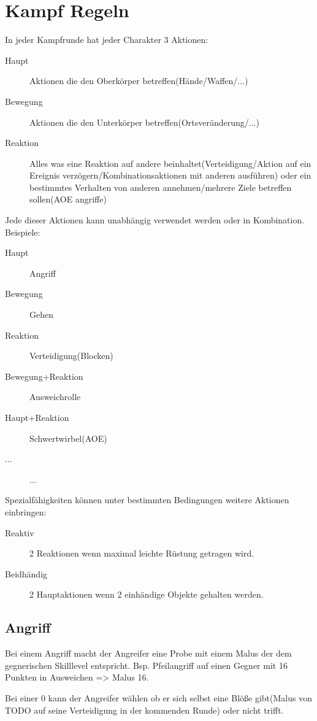\chapter{Kampf Regeln}

In jeder Kampfrunde hat jeder Charakter 3 Aktionen:
\begin{description}
\item[Haupt] Aktionen die den Oberkörper betreffen(Hände/Waffen/...)
\item[Bewegung] Aktionen die den Unterkörper betreffen(Ortsveränderung/...)
\item[Reaktion] Alles was eine Reaktion auf andere beinhaltet(Verteidigung/Aktion auf ein Ereignis verzögern/Kombinationsaktionen mit anderen ausführen) oder ein bestimmtes Verhalten von anderen annehmen/mehrere Ziele betreffen sollen(AOE angriffe)
\end{description}

Jede dieser Aktionen kann unabhängig verwendet werden oder in Kombination. Beispiele:
\begin{description}
\item[Haupt] Angriff
\item[Bewegung] Gehen
\item[Reaktion] Verteidigung(Blocken)
\item[Bewegung+Reaktion] Ausweichrolle
\item[Haupt+Reaktion] Schwertwirbel(AOE)
\item[...] ...
\end{description}

Spezialfähigkeiten können unter bestimmten Bedingungen weitere Aktionen einbringen:
\begin{description}
\item[Reaktiv] 2 Reaktionen wenn maximal leichte Rüstung getragen wird.
\item[Beidhändig] 2 Hauptaktionen wenn 2 einhändige Objekte gehalten werden.
\end{description}

\section{Angriff}
Bei einem Angriff macht der Angreifer eine Probe mit einem Malus der dem gegnerischen Skilllevel entspricht. Bsp. Pfeilangriff auf einen Gegner mit 16 Punkten in Ausweichen => Malus 16.

Bei einer 0 kann der Angreifer wählen ob er sich selbst eine Blöße gibt(Malus von TODO auf seine Verteidigung in der kommenden Runde) oder nicht trifft.

